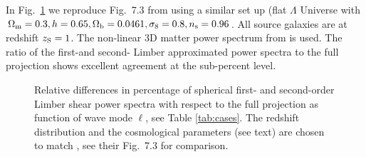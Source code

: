 \documentclass[fleqn,usenatbib]{mnras} %
\begin{document}
\begin{appendix}
In Fig.~\ref{fig:L1L2E_Rijt} we reproduce Fig.~7.3 from \cite{vande2012} using
a similar set up (flat $\Lambda$ Universe with $\Omega_{\rm m} = 0.3, h=0.65,
\Omega_{\rm b} = 0.0461, \sigma_8 = 0.8, n_{\rm s} = 0.96$. All source galaxies
are at redshift $z_{\rm S} = 1$. The non-linear 3D matter power spectrum from
\cite{2012ApJ...761..152T} is used. The ratio of the first-and second- Limber approximated
power spectra to the full
projection shows excellent agreement at the sub-percent level.

\begin{figure}

  \begin{center}
  \end{center}

    \caption{Relative differences in percentage of spherical first- and second-order Limber
    shear power spectra with respect to the full projection
    as function of wave mode $\ell$, see Table \ref{tab:cases}. The redshift distribution
    and the cosmological parameters (see text) are chosen to match
    \citet{vande2012}, see their Fig.~7.3 for comparison.
    }

    \label{fig:L1L2E_Rijt}

\end{figure}




\end{appendix}
\end{document}
